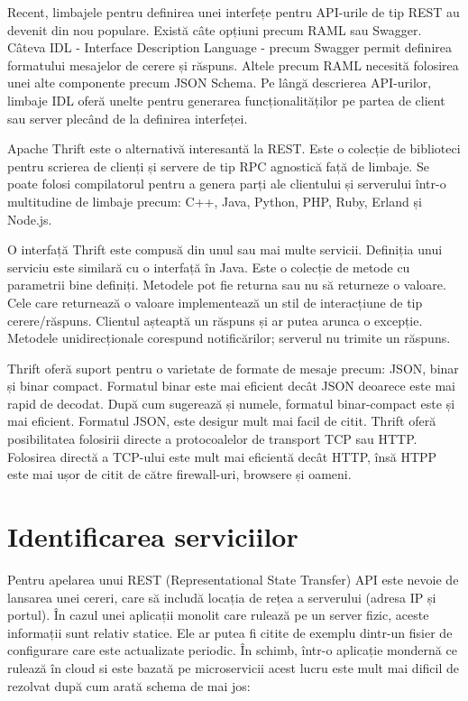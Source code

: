 \documentclass[12pt, a4paper, oneside, romanian]{teza-upb}
\begin{document}
Recent, limbajele pentru definirea unei interfețe pentru API-urile de tip REST au devenit din nou populare. Există câte opțiuni precum RAML sau Swagger. Câteva IDL - Interface Description Language - precum Swagger permit definirea formatului mesajelor de cerere și răspuns. Altele precum RAML necesită folosirea unei alte componente precum JSON Schema. Pe lângă descrierea API-urilor, limbaje IDL oferă unelte pentru generarea funcționalităților pe partea de client sau server plecând de la definirea interfeței. 

Apache Thrift este o alternativă interesantă la REST. Este o colecție de biblioteci pentru scrierea de clienți și servere de tip RPC agnostică față de limbaje. Se poate folosi compilatorul pentru a genera parți ale clientului și serverului într-o multitudine de limbaje precum: C++, Java, Python, PHP, Ruby, Erland și Node.js.

O interfață Thrift este compusă din unul sau mai multe servicii. Definiția unui serviciu este similară cu o interfață în Java. Este o colecție de metode cu parametrii bine definiți. Metodele pot fie returna sau nu să returneze o valoare. Cele care returnează o valoare implementează un stil de interacțiune de tip cerere/răspuns. Clientul așteaptă un răspuns și ar putea arunca o excepție. Metodele unidirecționale corespund notificărilor; serverul nu trimite un răspuns. 

Thrift oferă suport pentru o varietate de formate de mesaje precum: JSON, binar și binar compact. Formatul binar este mai eficient decât JSON deoarece este mai rapid de decodat. După cum sugerează și numele, formatul binar-compact este și mai eficient. Formatul JSON, este desigur mult mai facil de citit. Thrift oferă posibilitatea folosirii directe a protocoalelor de transport TCP sau HTTP. Folosirea directă a TCP-ului este mult mai eficientă decât HTTP, însă HTPP este mai ușor de citit de către firewall-uri, browsere și oameni. 


\section{Identificarea serviciilor}

Pentru apelarea unui REST (Representational State Transfer) API este nevoie de lansarea unei cereri, care să includă locația de rețea a serverului (adresa IP și portul). În cazul unei aplicații monolit care rulează pe un server fizic, aceste informații sunt relativ statice. Ele ar putea fi citite de exemplu dintr-un fisier de configurare care este actualizate periodic. În schimb, într-o aplicație mondernă ce rulează în cloud si este bazată pe microservicii acest lucru este mult mai dificil de rezolvat după cum arată schema de mai jos:
\end{document}
